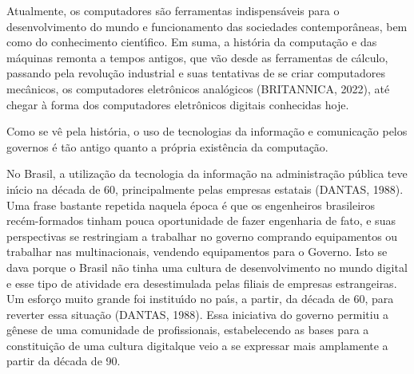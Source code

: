 \documentclass[
12pt,		%
openright,	%
twoside,  %
a4paper,			%
chapter=TITLE,		%
english,			%
french,				%
spanish,			%
brazil				%
]{USPSC-classe/USPSC}
\begin{document}
Atualmente, os computadores s\~ao ferramentas indispens\'aveis para o desenvolvimento do mundo e funcionamento das sociedades contempor\^aneas, bem como do conhecimento cient\'{\i}fico. Em suma, a hist\'oria da computa\c{c}\~ao e das m\'aquinas remonta a tempos antigos, que v\~ao desde as ferramentas de c\'alculo, passando pela revolu\c{c}\~ao industrial e suas tentativas de se criar computadores mec\^anicos, os computadores eletr\^onicos anal\'ogicos  (BRITANNICA, 2022), at\'e chegar \`a forma dos computadores eletr\^onicos digitais conhecidas hoje.

















Como se v\^e pela hist\'oria, o uso de tecnologias da informa\c{c}\~ao e comunica\c{c}\~ao pelos governos \'e t\~ao antigo quanto a pr\'opria exist\^encia da computa\c{c}\~ao.

















No Brasil, a utiliza\c{c}\~ao da tecnologia da informa\c{c}\~ao na administra\c{c}\~ao p\'ublica teve in\'{\i}cio na d\'ecada de 60, principalmente pelas empresas estatais  (DANTAS, 1988). Uma frase bastante repetida naquela \'epoca \'e que os engenheiros brasileiros rec\'em-formados tinham pouca oportunidade de fazer engenharia de fato, e suas perspectivas se restringiam a trabalhar no governo comprando equipamentos ou trabalhar nas multinacionais, vendendo equipamentos para o Governo. Isto se dava porque o Brasil n\~ao tinha uma cultura de desenvolvimento no mundo digital e esse tipo de atividade era desestimulada pelas filiais de empresas estrangeiras. Um esfor\c{c}o muito grande foi institu\'{\i}do no pa\'{\i}s, a partir, da d\'ecada de 60, para reverter essa situa\c{c}\~ao  (DANTAS, 1988). Essa iniciativa do governo permitiu a g\^enese de uma comunidade de profissionais, estabelecendo as bases para a constitui\c{c}\~ao de uma \textquotedbl  cultura digital\textquotedbl  que veio a se expressar mais amplamente a partir da d\'ecada de 90.
\end{document}
